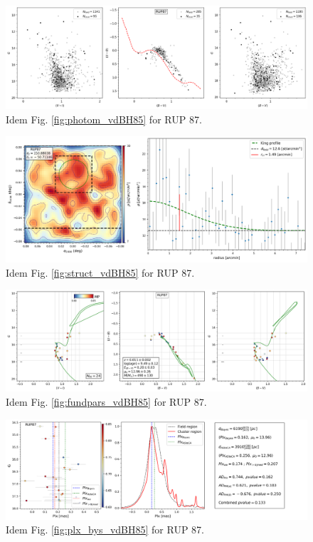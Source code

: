 \documentclass[referee]{aa}
\begin{document}
\begin{figure}[ht]
    \centering
    \includegraphics[width=\hsize]{../figs/obs_RUP87.png}
    \caption{Idem Fig. \ref{fig:photom_vdBH85} for RUP 87.}
    \label{fig:photom_RUP87}
\end{figure}
\begin{figure}[ht]
    \centering
    \includegraphics[width=\hsize]{../figs/dmap_rup87.png}
    \caption{Idem Fig. \ref{fig:struct_vdBH85} for RUP 87.}
    \label{fig:struct_RUP87}
\end{figure}
\begin{figure}[ht]
    \centering
    \includegraphics[width=\hsize]{../figs/cmds_rup87.png}
    \caption{Idem Fig. \ref{fig:fundpars_vdBH85} for RUP 87.}
    \label{fig:fundpars_RUP87}
\end{figure}
\begin{figure}[ht]
    \centering
    \includegraphics[width=\hsize]{../figs/plx_RUP87.png}
    \caption{Idem Fig. \ref{fig:plx_bys_vdBH85} for RUP 87.}
    \label{fig:plx_bys_RUP87}
\end{figure}
\end{document}

